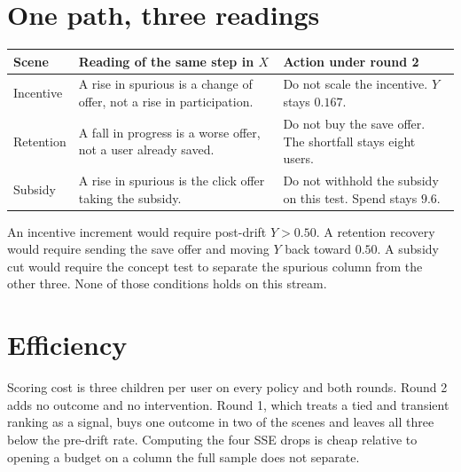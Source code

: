\documentclass[11pt,a4paper]{article}
\begin{document}
\section{One path, three readings}
\begin{center}
\begin{tabular}{p{2.2cm}p{5.4cm}p{5.6cm}}
\toprule
Scene & Reading of the same step in \(X\) & Action under round 2 \\
\midrule
Incentive & A rise in spurious is a change of offer, not a rise in participation. & Do not scale the incentive. \(Y\) stays \(0.167\). \\
Retention & A fall in progress is a worse offer, not a user already saved. & Do not buy the save offer. The shortfall stays eight users. \\
Subsidy & A rise in spurious is the click offer taking the subsidy. & Do not withhold the subsidy on this test. Spend stays \(9.6\). \\
\bottomrule
\end{tabular}
\end{center}

An incentive increment would require post-drift \(Y>0.50\). A retention recovery would require sending the save offer and moving \(Y\) back toward \(0.50\). A subsidy cut would require the concept test to separate the spurious column from the other three. None of those conditions holds on this stream.

\section{Efficiency}
Scoring cost is three children per user on every policy and both rounds. Round 2 adds no outcome and no intervention. Round 1, which treats a tied and transient ranking as a signal, buys one outcome in two of the scenes and leaves all three below the pre-drift rate. Computing the four SSE drops is cheap relative to opening a budget on a column the full sample does not separate.
\end{document}

